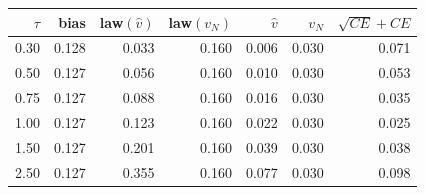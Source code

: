 \begin{tabular}{rrrrrrr}
\toprule
$\tau$ & bias & law$(\hat v)$ & law$(v_N)$ & $\hat v$ & $v_N$ & $\sqrt{CE}{+}CE$ \\
\midrule
0.30 & 0.128 & 0.033 & 0.160 & 0.006 & 0.030 & 0.071 \\
0.50 & 0.127 & 0.056 & 0.160 & 0.010 & 0.030 & 0.053 \\
0.75 & 0.127 & 0.088 & 0.160 & 0.016 & 0.030 & 0.035 \\
1.00 & 0.127 & 0.123 & 0.160 & 0.022 & 0.030 & 0.025 \\
1.50 & 0.127 & 0.201 & 0.160 & 0.039 & 0.030 & 0.038 \\
2.50 & 0.127 & 0.355 & 0.160 & 0.077 & 0.030 & 0.098 \\
\bottomrule
\end{tabular}